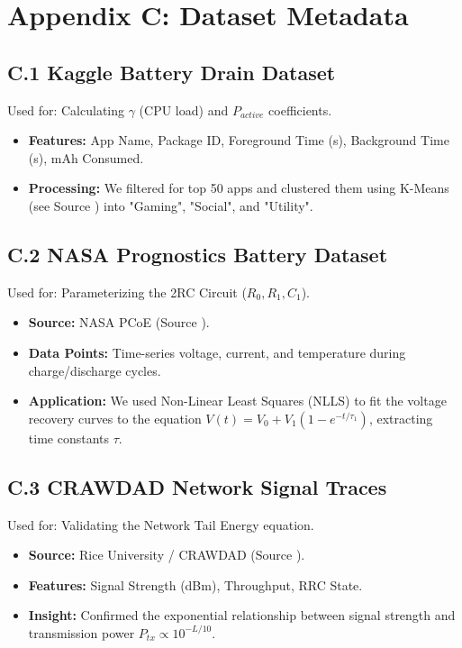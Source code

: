 \documentclass[12pt]{article}
\begin{document}
\section{Appendix C: Dataset Metadata}

\subsection*{C.1 Kaggle Battery Drain Dataset}
Used for: Calculating $\gamma$ (CPU load) and $P_{active}$ coefficients.
\begin{itemize}
    \item \textbf{Features:} App Name, Package ID, Foreground Time (s), Background Time (s), mAh Consumed.
    \item \textbf{Processing:} We filtered for top 50 apps and clustered them using K-Means (see Source \cite{12}) into "Gaming", "Social", and "Utility".
\end{itemize}

\subsection*{C.2 NASA Prognostics Battery Dataset}
Used for: Parameterizing the 2RC Circuit ($R_0, R_1, C_1$).
\begin{itemize}
    \item \textbf{Source:} NASA PCoE (Source \cite{8}).
    \item \textbf{Data Points:} Time-series voltage, current, and temperature during charge/discharge cycles.
    \item \textbf{Application:} We used Non-Linear Least Squares (NLLS) to fit the voltage recovery curves to the equation $V(t) = V_0 + V_1(1 - e^{-t/\tau_1})$, extracting time constants $\tau$.
\end{itemize}

\subsection*{C.3 CRAWDAD Network Signal Traces}
Used for: Validating the Network Tail Energy equation.
\begin{itemize}
    \item \textbf{Source:} Rice University / CRAWDAD (Source \cite{13}).
    \item \textbf{Features:} Signal Strength (dBm), Throughput, RRC State.
    \item \textbf{Insight:} Confirmed the exponential relationship between signal strength and transmission power $P_{tx} \propto 10^{-L/10}$.
\end{itemize}
\end{document}
